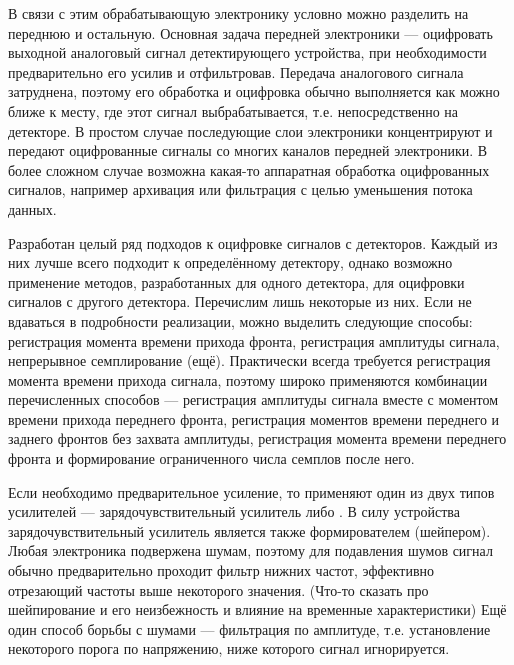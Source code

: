 В связи с этим обрабатывающую электронику условно можно разделить на переднюю и остальную. Основная задача передней электроники --- оцифровать выходной аналоговый сигнал детектирующего устройства, при необходимости предварительно его усилив и отфильтровав. Передача аналогового сигнала затруднена, поэтому его обработка и оцифровка обычно выполняется как можно ближе к месту, где этот сигнал выбрабатывается, т.е. непосредственно на детекторе. В простом случае последующие слои электроники концентрируют и передают оцифрованные сигналы со многих каналов передней электроники. В более сложном случае возможна какая-то аппаратная обработка оцифрованных сигналов, например архивация или фильтрация с целью уменьшения потока данных.

Разработан целый ряд подходов к оцифровке сигналов с детекторов. Каждый из них лучше всего подходит к определённому детектору, однако возможно применение методов, разработанных для одного детектора, для оцифровки сигналов с другого детектора. Перечислим лишь некоторые из них. Если не вдаваться в подробности реализации, можно выделить следующие способы: регистрация момента времени прихода фронта, регистрация амплитуды сигнала, непрерывное семплирование (ещё\todo). Практически всегда требуется регистрация момента времени прихода сигнала, поэтому широко применяются комбинации перечисленных способов --- регистрация амплитуды сигнала вместе с моментом времени прихода переднего фронта, регистрация моментов времени переднего и заднего фронтов без захвата амплитуды, регистрация момента времени переднего фронта и формирование ограниченного числа семплов после него.

Если необходимо предварительное усиление, то применяют один из двух типов усилителей --- зарядочувствительный усилитель либо \todo. В силу устройства зарядочувствительный усилитель является также формирователем (шейпером). Любая электроника подвержена шумам, поэтому для подавления шумов сигнал обычно предварительно проходит фильтр нижних частот, эффективно отрезающий частоты выше некоторого значения. (Что-то сказать про шейпирование и его неизбежность и влияние на временные характеристики) Ещё один способ борьбы с шумами --- фильтрация по амплитуде, т.е. установление некоторого порога по напряжению, ниже которого сигнал игнорируется. 

